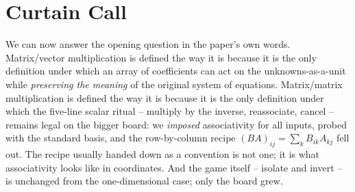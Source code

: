\documentclass{article}
\begin{document}
\section{Curtain Call}
We can now answer the opening question in the paper's own words.
Matrix/vector multiplication is defined the way it is because it is the only
definition under which an array of coefficients can act on the
unknowns-as-a-unit while {\em preserving the meaning\/} of the original system
of equations. Matrix/matrix multiplication is defined the way it is because it
is the only definition under which the five-line scalar ritual -- multiply by
the inverse, reassociate, cancel -- remains legal on the bigger board: we
{\em imposed\/} associativity for all inputs, probed with the standard basis,
and the row-by-column recipe $(BA)_{ij} = \sum_k B_{ik} A_{kj}$ fell out. The
recipe usually handed down as a convention is not one; it is what
associativity looks like in coordinates. And the game itself -- isolate and
invert -- is unchanged from the one-dimensional case; only the board grew.
\end{document}
